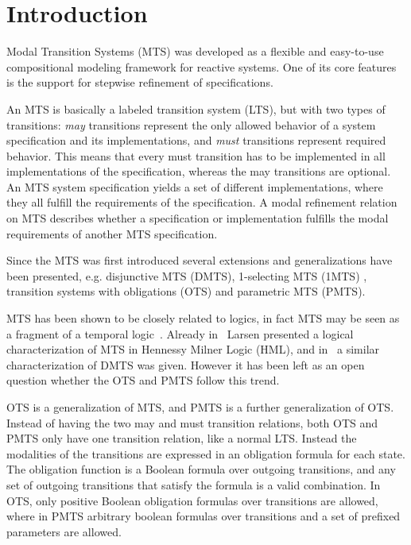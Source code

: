 \section{Introduction}

Modal  Transition  Systems  (MTS)   \cite{DBLP:conf/lics/LarsenT88,AHLNW:EATCS:08} was developed as a flexible  and easy-to-use  compositional modeling framework for reactive systems. One of its core features is the support for stepwise refinement of specifications. 

An MTS is basically a labeled transition system (LTS), but with two types of transitions: 
\emph{may} transitions represent the only allowed behavior of a system specification and its implementations, and \emph{must} transitions represent required behavior. This means that every must transition has to be implemented in all implementations of the specification, whereas the may transitions are optional. An MTS system specification yields a set of different implementations, where they all fulfill the requirements of the specification. A modal refinement relation on MTS describes whether a specification or implementation fulfills the modal requirements of another MTS specification.

Since the MTS was first introduced several extensions and generalizations have been presented, e.g. disjunctive MTS
(DMTS)\cite{DBLP:conf/lics/LarsenX90}, %
1-selecting MTS (1MTS) \cite{FS:JLAP:08}, transition  systems with
obligations (OTS)\cite{benes_et_al:OASIcs:2011:3070} and parametric MTS (PMTS)\cite{BKLMS:ATVA:11}. 

MTS has been shown to be closely related to logics, in fact MTS may be seen as a fragment of a temporal logic~\cite{DBLP:journals/tcs/BoudolL92}.
Already in~\cite{DBLP:conf/avmfss/Larsen89} Larsen presented a logical characterization of MTS in Hennessy Milner Logic (HML), and in~\cite{xinxin1992specification} a similar characterization of DMTS was given. However it has been left as an open question whether the OTS and PMTS follow this trend. 

OTS is a generalization of MTS, and PMTS is a further generalization of OTS.
Instead of having the two may and must transition relations, both OTS and PMTS only have one transition relation, like a normal LTS. Instead the modalities of the transitions are expressed in an obligation formula for each state. The obligation function is a Boolean formula over outgoing transitions, and any set of outgoing transitions that satisfy the formula is a valid combination. 
In OTS, only positive Boolean obligation formulas over transitions are allowed, where in PMTS arbitrary boolean formulas over transitions and a set of prefixed parameters are allowed.

